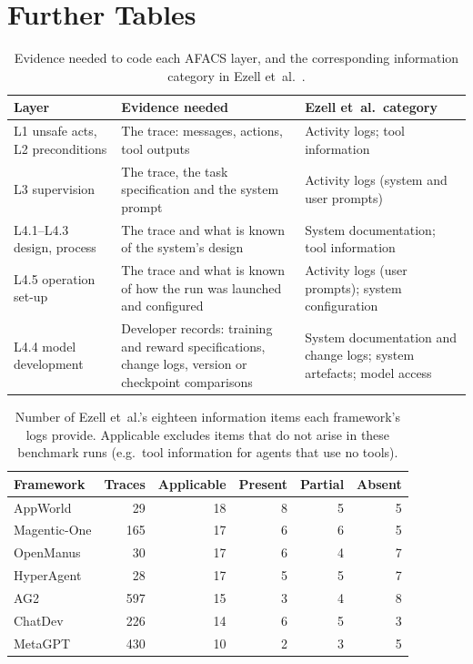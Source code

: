 \documentclass[11pt]{article}
\begin{document}
\section{Further Tables}
\label{app:tables}

\begin{table}[tbp]
\centering
\caption{Evidence needed to code each AFACS layer, and the corresponding
information category in Ezell et~al.~\cite{ezell2025incident}.}
\label{tab:evsource}
\small
\begin{tabular}{@{}L{3.4cm}L{6.2cm}L{4.6cm}@{}}
\toprule
Layer & Evidence needed & Ezell et~al.\ category\\
\midrule
L1 unsafe acts, L2 preconditions & The trace: messages, actions, tool outputs & Activity logs; tool information\\
L3 supervision & The trace, the task specification and the system prompt & Activity logs (system and user prompts)\\
L4.1--L4.3 design, process & The trace and what is known of the system's design & System documentation; tool information\\
L4.5 operation set-up & The trace and what is known of how the run was launched and configured & Activity logs (user prompts); system configuration\\
L4.4 model development & Developer records: training and reward specifications, change logs, version or checkpoint comparisons & System documentation and change logs; system artefacts; model access\\
\bottomrule
\end{tabular}
\end{table}

\begin{table}[tbp]
\centering
\caption{Number of Ezell et~al.'s eighteen information items each framework's
logs provide. Applicable excludes items that do not arise in these benchmark
runs (e.g.\ tool information for agents that use no tools).}
\label{tab:info}
\small
\begin{tabular}{@{}lrrrrr@{}}
\toprule
Framework & Traces & Applicable & Present & Partial & Absent\\
\midrule
AppWorld & 29 & 18 & 8 & 5 & 5\\
Magentic-One & 165 & 17 & 6 & 6 & 5\\
OpenManus & 30 & 17 & 6 & 4 & 7\\
HyperAgent & 28 & 17 & 5 & 5 & 7\\
AG2 & 597 & 15 & 3 & 4 & 8\\
ChatDev & 226 & 14 & 6 & 5 & 3\\
MetaGPT & 430 & 10 & 2 & 3 & 5\\
\bottomrule
\end{tabular}
\end{table}
\end{document}
